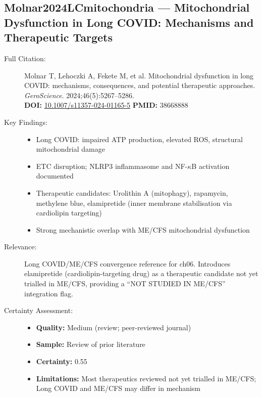 \subsection*{Molnar2024LCmitochondria --- Mitochondrial Dysfunction in Long COVID: Mechanisms and Therapeutic Targets}
\begin{description}
    \item[Full Citation:] Molnar T, Lehoczki A, Fekete M, et al. Mitochondrial dysfunction in long COVID: mechanisms, consequences, and potential therapeutic approaches. \textit{GeroScience}. 2024;46(5):5267--5286.\\
    \textbf{DOI:} \href{https://doi.org/10.1007/s11357-024-01165-5}{10.1007/s11357-024-01165-5} \quad \textbf{PMID:} 38668888
    \item[Key Findings:]
    \begin{itemize}
        \item Long COVID: impaired ATP production, elevated ROS, structural mitochondrial damage
        \item ETC disruption; NLRP3 inflammasome and NF-\(\kappa\)B activation documented
        \item Therapeutic candidates: Urolithin A (mitophagy), rapamycin, methylene blue, elamipretide (inner membrane stabilisation via cardiolipin targeting)
        \item Strong mechanistic overlap with ME/CFS mitochondrial dysfunction
    \end{itemize}
    \item[Relevance:] Long COVID/ME/CFS convergence reference for ch06. Introduces elamipretide (cardiolipin-targeting drug) as a therapeutic candidate not yet trialled in ME/CFS, providing a ``NOT STUDIED IN ME/CFS'' integration flag.
    \item[Certainty Assessment:]
    \begin{itemize}
        \item \textbf{Quality:} Medium (review; peer-reviewed journal)
        \item \textbf{Sample:} Review of prior literature
        \item \textbf{Certainty:} 0.55
        \item \textbf{Limitations:} Most therapeutics reviewed not yet trialled in ME/CFS; Long COVID and ME/CFS may differ in mechanism
    \end{itemize}
\end{description}

